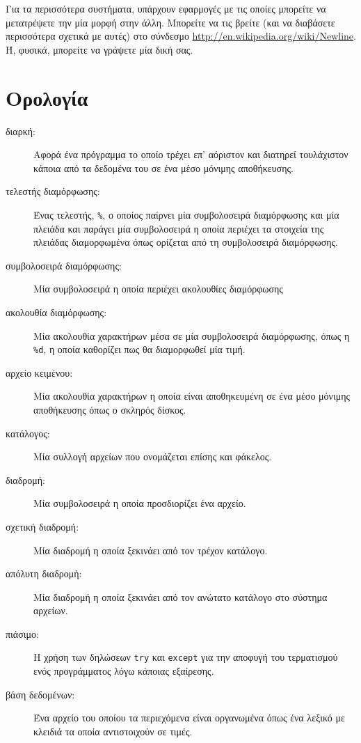 \documentclass[10pt]{book}
\begin{document}
 Για τα περισσότερα συστήματα, υπάρχουν εφαρμογές με τις οποίες μπορείτε να μετατρέψετε την μία μορφή στην άλλη. Μπορείτε να τις βρείτε (και να διαβάσετε περισσότερα σχετικά με αυτές) στο σύνδεσμο  \url{http://en.wikipedia.org/wiki/Newline}.  Ή, φυσικά, μπορείτε να γράψετε μία δική σας. 


\section{Ορολογία}

\begin{description}

\item[διαρκή:] Αφορά ένα πρόγραμμα το οποίο τρέχει επ' αόριστον και διατηρεί τουλάχιστον κάποια από τα δεδομένα του σε 
ένα μέσο μόνιμης αποθήκευσης.

\item[τελεστής διαμόρφωσης:] Ένας τελεστής,  {\tt \%},  ο οποίος παίρνει μία συμβολοσειρά διαμόρφωσης και μία πλειάδα 
και παράγει μία συμβολοσειρά η οποία περιέχει τα στοιχεία της πλειάδας διαμορφωμένα όπως ορίζεται από τη συμβολοσειρά διαμόρφωσης.

\item[συμβολοσειρά διαμόρφωσης:] Μία συμβολοσειρά η οποία περιέχει ακολουθίες διαμόρφωσης

\item[ακολουθία διαμόρφωσης:] Μία ακολουθία χαρακτήρων μέσα σε μία συμβολοσειρά διαμόρφωσης, όπως η  {\tt \%d},  η οποία καθορίζει πως θα διαμορφωθεί μία τιμή.

\item[αρχείο κειμένου:] Μία ακολουθία χαρακτήρων η οποία είναι αποθηκευμένη σε ένα μέσο μόνιμης αποθήκευσης όπως ο σκληρός δίσκος.

\item[κατάλογος:] Μία συλλογή αρχείων που ονομάζεται επίσης και φάκελος.

\item[διαδρομή:] Μία συμβολοσειρά η οποία προσδιορίζει ένα αρχείο.

\item[σχετική διαδρομή:] Μία διαδρομή η οποία ξεκινάει από τον τρέχον κατάλογο.

\item[απόλυτη διαδρομή:] Μία διαδρομή η οποία ξεκινάει από τον ανώτατο κατάλογο στο σύστημα αρχείων.

\item[πιάσιμο:] Η χρήση των δηλώσεων  {\tt try}  και  {\tt except}  για την αποφυγή του τερματισμού ενός προγράμματος 
λόγω κάποιας εξαίρεσης.

\item[βάση δεδομένων:] Ένα αρχείο του οποίου τα περιεχόμενα είναι οργανωμένα όπως ένα λεξικό με κλειδιά τα οποία αντιστοιχούν σε τιμές. 

\end{description}
\end{document}
